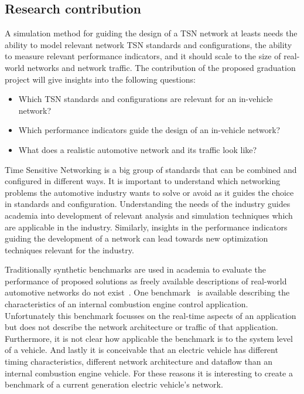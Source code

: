 \subsection{Research contribution}
\label{sec:researchcontribution}
A simulation method for guiding the design of a TSN network at leasts needs the ability to model relevant network TSN standards and configurations, the ability to measure relevant performance indicators, and it should scale to the size of real-world networks and network traffic. The contribution of the proposed graduation project will give insights into the following questions:
\begin{itemize}
    \item Which TSN standards and configurations are relevant for an in-vehicle network?
    \item Which performance indicators guide the design of an in-vehicle network?
    \item What does a realistic automotive network and its traffic look like?

\end{itemize}

Time Sensitive Networking is a big group of standards that can be combined and configured in different ways. It is important to understand which networking problems the automotive industry wants to solve or avoid as it guides the choice in standards and configuration. Understanding the needs of the industry guides academia into development of relevant analysis and simulation techniques which are applicable in the industry. Similarly, insights in the performance indicators guiding the development of a network can lead towards new optimization techniques relevant for the industry.

Traditionally synthetic benchmarks are used in academia to evaluate the performance of proposed solutions as freely available descriptions of real-world automotive networks do not exist~\cite{ashjaei2021time}. One benchmark~\cite{kramer2015real} is available describing the characteristics of an internal combustion engine control application. Unfortunately this benchmark focusses on the real-time aspects of an application but does not describe the network architecture or traffic of that application. Furthermore, it is not clear how applicable the benchmark is to the system level of a vehicle. And lastly it is conceivable that an electric vehicle has different timing characteristics, different network architecture and dataflow than an internal combustion engine vehicle. For these reasons it is interesting to create a benchmark of a current generation electric vehicle's network.


